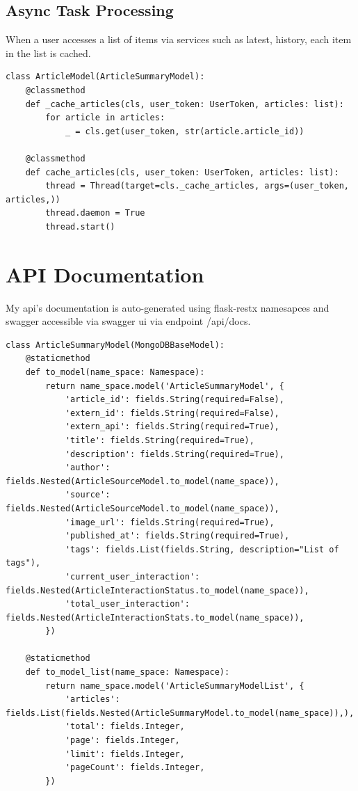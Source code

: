\subsection{Async Task Processing}\label{subsec:async-task-processing}

When a user accesses a list of items via services such as latest, history, each item in the list is cached.

\begin{lstlisting}[style=pythonstyle,label={lst:async-cache-article},caption={Async Cache Article}]
class ArticleModel(ArticleSummaryModel):
    @classmethod
    def _cache_articles(cls, user_token: UserToken, articles: list):
        for article in articles:
            _ = cls.get(user_token, str(article.article_id))

    @classmethod
    def cache_articles(cls, user_token: UserToken, articles: list):
        thread = Thread(target=cls._cache_articles, args=(user_token, articles,))
        thread.daemon = True
        thread.start()
\end{lstlisting}


\section{API Documentation}\label{sec:api-documentation}

My api's documentation is auto-generated using flask-restx namesapces and swagger accessible via swagger ui via endpoint /api/docs.

\begin{lstlisting}[style=pythonstyle,label={lst:api-documentation-article-summary},caption={Api Docuentation Article Summary}]
class ArticleSummaryModel(MongoDBBaseModel):
    @staticmethod
    def to_model(name_space: Namespace):
        return name_space.model('ArticleSummaryModel', {
            'article_id': fields.String(required=False),
            'extern_id': fields.String(required=False),
            'extern_api': fields.String(required=True),
            'title': fields.String(required=True),
            'description': fields.String(required=True),
            'author': fields.Nested(ArticleSourceModel.to_model(name_space)),
            'source': fields.Nested(ArticleSourceModel.to_model(name_space)),
            'image_url': fields.String(required=True),
            'published_at': fields.String(required=True),
            'tags': fields.List(fields.String, description="List of tags"),
            'current_user_interaction': fields.Nested(ArticleInteractionStatus.to_model(name_space)),
            'total_user_interaction': fields.Nested(ArticleInteractionStats.to_model(name_space)),
        })

    @staticmethod
    def to_model_list(name_space: Namespace):
        return name_space.model('ArticleSummaryModelList', {
            'articles': fields.List(fields.Nested(ArticleSummaryModel.to_model(name_space)),),
            'total': fields.Integer,
            'page': fields.Integer,
            'limit': fields.Integer,
            'pageCount': fields.Integer,
        })
\end{lstlisting}






